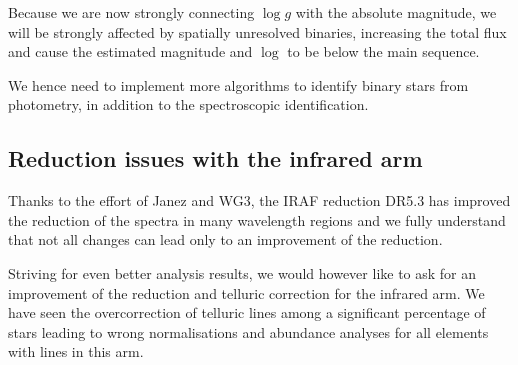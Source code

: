 \documentclass[a4paper,11pt,english]{article}
\begin{document}
Because we are now strongly connecting $\log g$ with the absolute magnitude, we will be strongly affected by spatially unresolved binaries, increasing the total flux and cause the estimated magnitude and $\log $ to be below the main sequence.

We hence need to implement more algorithms to identify binary stars from photometry, in addition to the spectroscopic identification.

\subsection{Reduction issues with the infrared arm}

Thanks to the effort of Janez and WG3, the IRAF reduction DR5.3 has improved the reduction of the spectra in many wavelength regions and we fully understand that not all changes can lead only to an improvement of the reduction.

Striving for even better analysis results, we would however like to ask for an improvement of the reduction and telluric correction for the infrared arm. We have seen the overcorrection of telluric lines among a significant percentage of stars leading to wrong normalisations and abundance analyses for all elements with lines in this arm.
\end{document}
